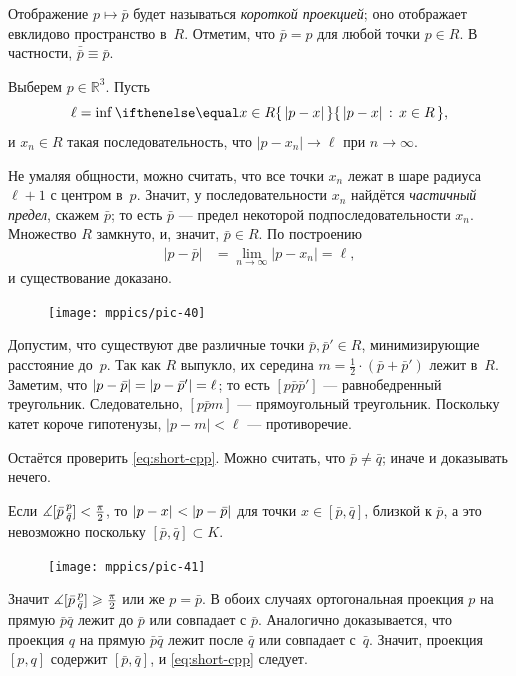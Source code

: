 Отображение $p\mapsto \bar p$ будет называться \label{проекция на ближайшую точку}\emph{короткой проекцией};
оно отображает евклидово пространство в~$R$.
Отметим, что $\bar p=p$ для любой точки $p\in R$.
В частности, $\bar{\bar p}\equiv\bar p$.

Выберем $p\in \mathbb{R}^3$.
Пусть 
\[\ell=\inf\set{|p-x|}{x\in R},\]
и $x_n\in R$ такая последовательность, что $|p-x_n|\to \ell$ при $n\to\infty$.

Не умаляя общности, можно считать, что все точки $x_n$ лежат в шаре радиуса $\ell+1$ с центром в~$p$.
Значит, у последовательности $x_n$ найдётся \emph{частичный предел}, скажем $\bar p$;
то есть $\bar p$ --- предел некоторой подпоследовательности $x_n$.
Множество $R$ замкнуто, и, значит, $\bar p\in R$.
По построению 
\begin{align*}
|p-\bar p|&=\lim_{n\to\infty}|p-x_n|=\ell,
\end{align*}
и существование доказано.

{

\begin{figure}
\vskip-0mm
\centering
\texttt{[image: mppics/pic-40]}
\vskip-0mm
\end{figure}

Допустим, что существуют две различные точки $\bar p, \bar p'\in R$, минимизирующие расстояние до~$p$.
Так как $R$ выпукло, их середина $m=\tfrac12\cdot (\bar p+\bar p')$ лежит в~$R$.
Заметим, что $|p-\bar p|\z=|p-\bar p'|=\ell$;
то есть $[p\bar p\bar p']$ --- равнобедренный треугольник.
Следовательно, $[p\bar p m]$ --- прямоугольный треугольник.
Поскольку катет короче гипотенузы, $|p-m|<\ell$ --- противоречие. 

Остаётся проверить \ref{eq:short-cpp}.
Можно считать, что $\bar p\ne\bar q$; иначе и доказывать нечего.

}

Если $\measuredangle [\bar p\,{}^{p}_{\bar q}]< \tfrac\pi2$, то $\dist{p}{x}{}\z<\dist{p}{\bar p}{}$ для точки $x\in [\bar p,\bar q]$, близкой к $\bar p$,
а это невозможно поскольку $[\bar p,\bar q]\subset K$.

{

\begin{figure}
\vskip-8mm
\centering
\texttt{[image: mppics/pic-41]}
\vskip-0mm
\end{figure}

Значит $\measuredangle [\bar p\,{}^{p}_{\bar q}]\geqslant \tfrac\pi2$ или же $p=\bar p$.
В обоих случаях ортогональная проекция $p$ на прямую $\bar p\bar q$ лежит до $\bar p$ или совпадает с $\bar p$.
Аналогично доказывается, что проекция $q$ на прямую $\bar p\bar q$ лежит после $\bar q$ или совпадает с~$\bar q$.
Значит, проекция $[p,q]$ содержит $[\bar p,\bar q]$,
и \ref{eq:short-cpp} следует.
\qeds

}

